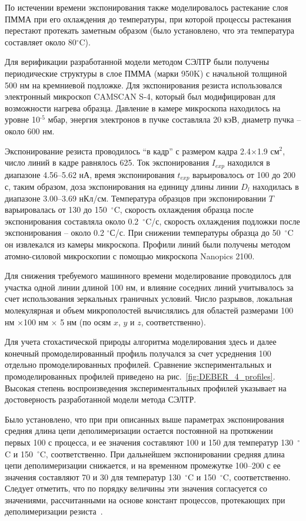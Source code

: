 По истечении времени экспонирования также моделировалось растекание слоя ПММА при его охлаждения до температуры, при которой процессы растекания перестают протекать заметным образом (было установлено, что эта температура составляет около 80$^\circ$C).

Для верификации разработанной модели методом СЭЛТР были получены периодические структуры в слое ПММА (марки 950K) с начальной толщиной 500 нм на кремниевой подложке. Для экспонирования резиста использовался электронный микроскоп CAMSCAN S-4, который был модифицирован для возможности нагрева образца. Давление в камере микроскопа находилось на уровне 10$^{\text{-5}}$ мбар, энергия электронов в пучке составляла 20 кэВ, диаметр пучка -- около 600 нм.

Экспонирование резиста проводилось ``в кадр'' с размером кадра 2.4$\times$1.9 см$^\text{2}$, число линий в кадре равнялось 625. Ток экспонирования $I_{exp}$ находился в диапазоне 4.56--5.62 нА, время экспонирования $t_{exp}$ варьировалось от 100 до 200 с, таким образом, доза экспонирования на единицу длины линии $D_l$ находилась в диапазоне 3.00--3.69 нКл/см. Температура образцов при экспонировании $T$ варьировалась от 130 до 150~$^\circ$C, скорость охлаждения образца после экспонирования составляла около 0.2~$^\circ$C/с, скорость охлаждения подложки после экспонирования -- около 0.2 $^\circ$С/с. При снижении температуры образца до 50~$^\circ$C он извлекался из камеры микроскопа. Профили линий были получены методом атомно-силовой микроскопии с помощью микроскопа Nanopics 2100.

Для снижения требуемого машинного времени моделирование проводилось для участка одной линии длиной 100 нм, и влияние соседних линий учитывалось за счет использования зеркальных граничных условий. Число разрывов, локальная молекулярная и объем микрополостей вычислялись для областей размерами 100 нм $\times $100 нм $\times$ 5 нм (по осям $x$, $y$ и $z$, соответственно).

Для учета стохастической природы алгоритма моделирования здесь и далее конечный промоделированный профиль получался за счет усреднения 100 отдельно промоделированных профилей. Сравнение экспериментальных и промоделированных профилей приведено на рис.~\ref{fig:DEBER_4_profiles}. Высокая степень воспроизведения экспериментальных профилей указывает на достоверность разработанной модели метода СЭЛТР.

Было установлено, что при при описанных выше параметрах экспонирования средняя длина цепи деполимеризации остается постоянной на протяжении первых 100 с процесса, и ее значения составляют 100 и 150 для температур 130~$^\circ$C и 150~$^\circ$C, соответственно. При дальнейшем экспонировании средняя длина цепи деполимеризации снижается, и на временном промежутке 100--200 с ее значения составляют 70 и 30 для температур 130~$^\circ$C и 150~$^\circ$C, соответственно. Следует отметить, что по порядку величины эти значения согласуется со значениями, рассчитанными на основе констант процессов, протекающих при деполимеризации резиста~\cite{Mita_PMMA_zip_lengths_T}.

